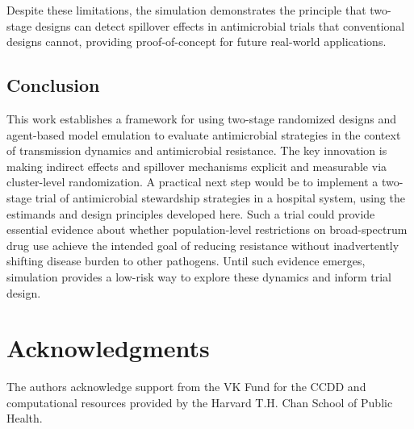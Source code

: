 \documentclass[preprint,11pt]{elsarticle}
\begin{document}
Despite these limitations, the simulation demonstrates the principle that two-stage designs can detect spillover effects in antimicrobial trials that conventional designs cannot, providing proof-of-concept for future real-world applications.

\subsection{Conclusion}

This work establishes a framework for using two-stage randomized designs and agent-based model emulation to evaluate antimicrobial strategies in the context of transmission dynamics and antimicrobial resistance. The key innovation is making indirect effects and spillover mechanisms explicit and measurable via cluster-level randomization. A practical next step would be to implement a two-stage trial of antimicrobial stewardship strategies in a hospital system, using the estimands and design principles developed here. Such a trial could provide essential evidence about whether population-level restrictions on broad-spectrum drug use achieve the intended goal of reducing resistance without inadvertently shifting disease burden to other pathogens. Until such evidence emerges, simulation provides a low-risk way to explore these dynamics and inform trial design.

\section*{Acknowledgments}

The authors acknowledge support from the VK Fund for the CCDD and computational resources provided by the Harvard T.H. Chan School of Public Health.



\end{document}
